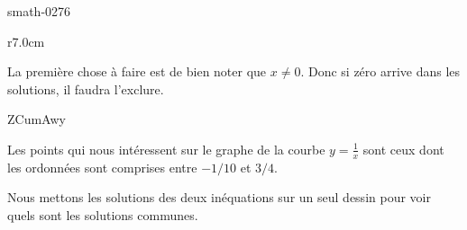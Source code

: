 
\begin{corrige}{smath-0276}

\begin{wrapfigure}{r}{7.0cm}
            \vspace{-2cm}        %
                \centering
                    
\end{wrapfigure}

La première chose à faire est de bien noter que \( x\neq 0\). Donc si zéro arrive dans les solutions, il faudra l'exclure.

ZCumAwy

Les points qui nous intéressent sur le graphe de la courbe \( y=\frac{1}{ x }\) sont ceux dont les ordonnées sont comprises entre \( -1/10\) et \( 3/4\).

Nous mettons les solutions des deux inéquations sur un seul dessin pour voir quels sont les solutions communes.

\end{corrige}
